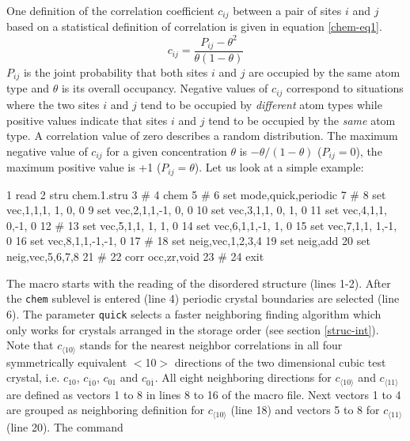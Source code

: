 One definition of the correlation coefficient $c_{ij}$ between a
pair of sites $i$ and $j$ based on a statistical definition of
correlation \citep{we85} is given in equation \ref{chem-eq1}.
%
\begin{equation}
    c_{ij} = \frac {P_{ij} - \theta^{2}} { \theta (1 - \theta)}
    \label{chem-eq1}
\end{equation}
%
$P_{ij}$ is the joint probability that both sites $i$ and $j$ are
occupied by the same atom type and $\theta$ is its overall
occupancy.  Negative values of $c_{ij}$ correspond to situations
where the two sites $i$ and $j$ tend to be occupied by {\it
different} atom types while positive values indicate that sites $i$
and $j$ tend to be occupied by the {\it same} atom type.  A
correlation value of zero describes a random distribution.  The
maximum negative value of $c_{ij}$ for a given concentration
$\theta$ is $-\theta/(1-\theta)$ ($P_{ij}=0$), the maximum positive
value is +1 ($P_{ij}=\theta$). Let us look at a simple example:
%
\begin{MacVerbatim}
     1  read
     2  stru chem.1.stru
     3  #
     4  chem
     5  #
     6    set mode,quick,periodic
     7  #
     8    set vec,1,1,1, 1, 0, 0
     9    set vec,2,1,1,-1, 0, 0
    10    set vec,3,1,1, 0, 1, 0
    11    set vec,4,1,1, 0,-1, 0
    12  #
    13    set vec,5,1,1, 1, 1, 0
    14    set vec,6,1,1,-1, 1, 0
    15    set vec,7,1,1, 1,-1, 0
    16    set vec,8,1,1,-1,-1, 0
    17  #
    18    set neig,vec,1,2,3,4
    19    set neig,add
    20    set neig,vec,5,6,7,8
    21  #
    22    corr occ,zr,void
    23  #
    24  exit
\end{MacVerbatim}
%
The macro starts with the reading of the disordered structure (lines
1-2). After the {\tt chem} sublevel is entered (line 4) periodic
crystal boundaries are selected (line 6).  The parameter {\tt quick}
selects a faster neighboring finding algorithm which only works for
crystals arranged in the \Discus storage order (see section
\ref{struc-int}).  Note that $c_{\langle 10 \rangle}$ stands for the
nearest neighbor correlations in all four symmetrically equivalent
$<$10$>$ directions of the two dimensional cubic test crystal, i.e.
$c_{10}$, $c_{\overline{1}0}$, $c_{01}$ and $c_{0 \overline{1}}$.
All eight neighboring directions for $c_{\langle 10 \rangle}$ and
$c_{\langle 11 \rangle}$ are defined as vectors 1 to 8 in lines 8 to
16 of the macro file.  Next vectors 1 to 4 are grouped as
neighboring definition for $c_{\langle 10 \rangle}$ (line 18) and
vectors 5 to 8 for $c_{\langle 11 \rangle}$ (line 20).  The command
